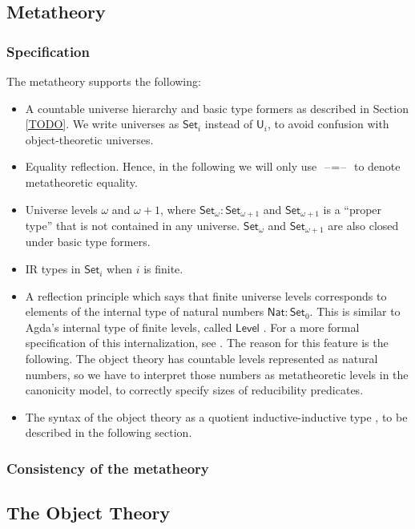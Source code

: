 \documentclass[acmsmall,screen,review,anonymous]{acmart}
\newcommand{\msf}[1]{{\mathsf{#1}}}
\newcommand{\U}{\msf{U}}
\newcommand{\Set}{\msf{Set}}
\newcommand{\Nat}{\msf{Nat}}
\newcommand{\blank}{{\mathord{\hspace{1pt}\text{--}\hspace{1pt}}}}
\newcommand{\Level}{\msf{Level}}
\begin{document}
\subsection{Metatheory}\label{sec:metatheory}

\subsubsection{Specification} The metatheory supports the following:
\begin{itemize}
  \item A countable universe hierarchy and basic type formers as described in Section \ref{TODO}.
    We write universes as $\Set_i$ instead of $\U_i$, to avoid confusion with object-theoretic
    universes.
  \item Equality reflection. Hence, in the following we will only use $\blank\!=\!\blank$ to denote
    metatheoretic equality.
  \item Universe levels $\omega$ and $\omega+1$, where $\Set_\omega : \Set_{\omega + 1}$ and $\Set_{\omega + 1}$
        is a ``proper type'' that is not contained in any universe. $\Set_\omega$ and $\Set_{\omega + 1}$ are
        also closed under basic type formers.
  \item IR types in $\Set_i$ when $i$ is finite.
  \item A reflection principle which says that finite universe levels corresponds to elements of the
    internal type of natural numbers $\Nat : \Set_0$. This is similar to Agda's internal type of
    finite levels, called $\Level$ \cite{TODO}.  For a more formal specification of this
    internalization, see \cite{TODO}. The reason for this feature is the following. The object
    theory has countable levels represented as natural numbers, so we have to interpret those
    numbers as metatheoretic levels in the canonicity model, to correctly specify sizes of
    reducibility predicates.
  \item The syntax of the object theory as a quotient inductive-inductive type \cite{TODO}, to be
    described in the following section.
\end{itemize}

\subsubsection{Consistency of the metatheory}


\subsection{The Object Theory}\label{sec:object-theory}
\end{document}
